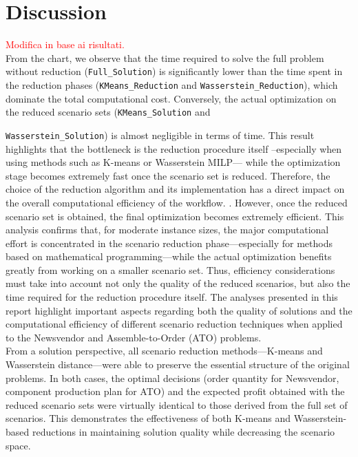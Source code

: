 \documentclass[a4paper,12pt]{article}
\begin{document}
	\section{Discussion}
	
	\textcolor{red}{Modifica in base ai risultati.}\\
	
	\noindent From the chart, we observe that the time required to solve the full problem without reduction (\texttt{Full\_Solution}) is significantly lower than the time spent in the reduction phases (\texttt{KMeans\_Reduction} and \texttt{Wasserstein\_Reduction}), which dominate the total computational cost. Conversely, the actual optimization on the reduced scenario sets (\texttt{KMeans\_Solution} and 
	
	\texttt{Wasserstein\_Solution}) is almost negligible in terms of time. This result highlights that the bottleneck is the reduction procedure itself --especially when using methods such as K-means or Wasserstein MILP— while the optimization stage becomes extremely fast once the scenario set is reduced. Therefore, the choice of the reduction algorithm and its implementation has a direct impact on the overall computational efficiency of the workflow. . However, once the reduced scenario set is obtained, the final optimization becomes extremely efficient. This analysis confirms that, for moderate instance sizes, the major computational effort is concentrated in the scenario reduction phase—especially for methods based on mathematical programming—while the actual optimization benefits greatly from working on a smaller scenario set. Thus, efficiency considerations must take into account not only the quality of the reduced scenarios, but also the time required for the reduction procedure itself. The analyses presented in this report highlight important aspects regarding both the quality of solutions and the computational efficiency of different scenario reduction techniques when applied to the Newsvendor and Assemble-to-Order (ATO) problems.\\
	
	
	From a solution perspective, all scenario reduction methods—K-means and Wasserstein distance—were able to preserve the essential structure of the original problems. In both cases, the optimal decisions (order quantity for Newsvendor, component production plan for ATO) and the expected profit obtained with the reduced scenario sets were virtually identical to those derived from the full set of scenarios. This demonstrates the effectiveness of both K-means and Wasserstein-based reductions in maintaining solution quality while decreasing the scenario space.\\
	
\end{document}
